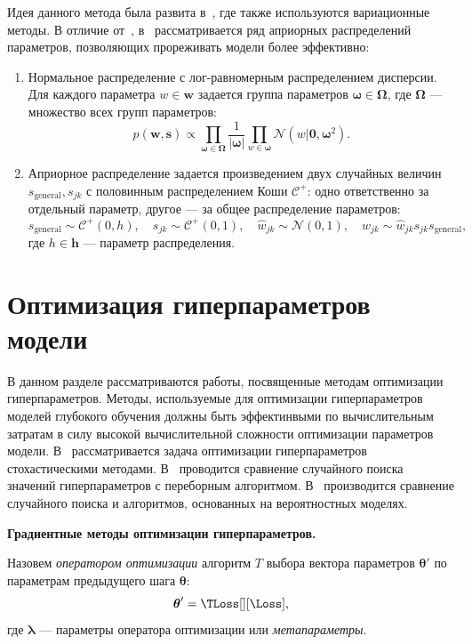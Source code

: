 Идея данного метода была развита в~\cite{bayes_compr}, где также используются вариационные методы.  В отличие от~\cite{nips}, в~\cite{bayes_compr} рассматривается ряд априорных распределений параметров, позволяющих прореживать модели более эффективно:
\begin{enumerate}
\item Нормальное распределение с лог-равномерным распределением дисперсии. Для каждого параметра $w \in \mathbf{w}$ задается группа параметров $\boldsymbol{\omega} \in \boldsymbol{\Omega}$, где $\boldsymbol{\Omega}$ --- множество всех групп параметров:
\[
    p(\mathbf{w}, \mathbf{s}) \propto \prod_{\boldsymbol{\omega} \in \boldsymbol{\Omega}} \frac{1}{|\boldsymbol{\omega}|}\prod_{w \in \boldsymbol{\omega}}\mathcal{N}(w|\mathbf{0}, \boldsymbol{\omega}^2).
\]
\item Априорное распределение задается произведением двух случайных величин ${s}_{\text{general}}, {s}_{jk}$ с половинным распределением Коши $\mathcal{C}^{+}$: одно ответственно за отдельный параметр, другое --- за общее распределение параметров:
\[
    {s}_{\text{general}} \sim \mathcal{C}^{+}(0, h), \quad  {s}_{jk} \sim \mathcal{C}^{+}(0,1), \quad \hat{w}_{jk} \sim \mathcal{N}(0,1), \quad w_{jk} \sim \hat{w}_{jk}s_{jk}  {s}_{\text{general}},
\]
где $h \in \mathbf{h}$ --- параметр распределения.

\end{enumerate}

\section{Оптимизация гиперпараметров модели}
В данном разделе рассматриваются работы, посвященные методам оптимизации гиперпараметров. Методы, используемые для оптимизации гиперпараметров моделей глубокого обучения должны быть эффектинвыми по вычислительным затратам в силу высокой вычислительной сложности оптимизации параметров модели. 
В~\cite{random1,random2} рассматривается задача оптимизации гиперпараметров стохастическими методами. В~\cite{random1} проводится сравнение случайного поиска значений гиперпараметров с переборным алгоритмом. В~\cite{random2} производится сравнение случайного поиска и алгоритмов, основанных на вероятностных моделях.

\textbf{Градиентные методы оптимизации гиперпараметров. } 
\begin{defin} Назовем \textit{оператором оптимизации} алгоритм $T$ выбора вектора параметров $\boldsymbol{\theta}'$  по параметрам предыдущего шага $\boldsymbol{\theta}$:
\begin{equation}
\label{eq:optim_operator}
	\teta' = \TLoss[][\Loss],
\end{equation}
где $\boldsymbol{\lambda}$ --- параметры оператора оптимизации или \textit{метапараметры}.
\end{defin}


